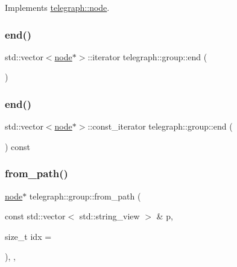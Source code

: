Implements \hyperlink{classtelegraph_1_1node_a68c4aed1434da1f0ece9089ff99ffcdb}{telegraph\+::node}.

\mbox{\label{classtelegraph_1_1group_afe980e1a055ebba5eb236cf09738bad8}} 
\subsubsection{\texorpdfstring{end()}{end()}\hspace{0.1cm}{\footnotesize\ttfamily [1/2]}}
{\footnotesize\ttfamily std\+::vector$<$\hyperlink{classtelegraph_1_1node}{node}$\ast$$>$\+::iterator telegraph\+::group\+::end (\begin{DoxyParamCaption}{ }\end{DoxyParamCaption})\hspace{0.3cm}{\ttfamily [inline]}}

\mbox{\label{classtelegraph_1_1group_ab06ca45e8bd109f94d2ea763c92de677}} 
\subsubsection{\texorpdfstring{end()}{end()}\hspace{0.1cm}{\footnotesize\ttfamily [2/2]}}
{\footnotesize\ttfamily std\+::vector$<$\hyperlink{classtelegraph_1_1node}{node}$\ast$$>$\+::const\+\_\+iterator telegraph\+::group\+::end (\begin{DoxyParamCaption}{ }\end{DoxyParamCaption}) const\hspace{0.3cm}{\ttfamily [inline]}}

\mbox{\label{classtelegraph_1_1group_a27e8f2ecfe0b87fef8ca57c43fda8809}} 
\subsubsection{\texorpdfstring{from\+\_\+path()}{from\_path()}\hspace{0.1cm}{\footnotesize\ttfamily [1/2]}}
{\footnotesize\ttfamily \hyperlink{classtelegraph_1_1node}{node}$\ast$ telegraph\+::group\+::from\+\_\+path (\begin{DoxyParamCaption}\item[{const std\+::vector$<$ std\+::string\+\_\+view $>$ \&}]{p,  }\item[{size\+\_\+t}]{idx = {} }\end{DoxyParamCaption})\hspace{0.3cm}{\ttfamily [inline]}, {\ttfamily [override]}, {\ttfamily [virtual]}}



